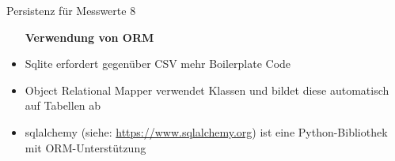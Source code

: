 \begin{frame}[fragile]{Persistenz für Messwerte 8}
       \begin{itemize}
        \setlength{\itemindent}{1.9in}
        \item [\textbf{Verwendung von ORM }]
    \end{itemize}

    \begin{itemize}
        \item Sqlite erfordert gegenüber CSV mehr Boilerplate Code
        \item Object Relational Mapper verwendet Klassen und bildet diese automatisch auf Tabellen ab
        \item sqlalchemy (siehe: \url{https://www.sqlalchemy.org}) ist eine Python-Bibliothek mit ORM-Unterstützung  
     \end{itemize}

\end{frame}
